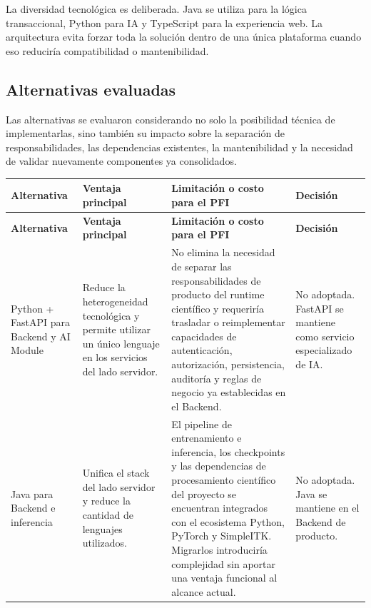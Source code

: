 La diversidad tecnológica es deliberada. Java se utiliza para la lógica transaccional, Python para IA y TypeScript para la experiencia web. La arquitectura evita forzar toda la solución dentro de una única plataforma cuando eso reduciría compatibilidad o mantenibilidad.

\subsection{Alternativas evaluadas}

Las alternativas se evaluaron considerando no solo la posibilidad técnica de implementarlas, sino también su impacto sobre la separación de responsabilidades, las dependencias existentes, la mantenibilidad y la necesidad de validar nuevamente componentes ya consolidados.

{\scriptsize
\setlength{\LTleft}{0pt}
\setlength{\LTright}{0pt}
\setlength{\tabcolsep}{2pt}
\renewcommand{\arraystretch}{1.18}
\label{tab:arch-alternativas}
\begin{longtable}{>{\raggedright\arraybackslash}p{} >{\raggedright\arraybackslash}p{} >{\raggedright\arraybackslash}p{} >{\raggedright\arraybackslash}p{}}
\hline
\textbf{Alternativa} & \textbf{Ventaja principal} & \textbf{Limitación o costo para el PFI} & \textbf{Decisión} \\
\hline
\endfirsthead
\hline
\textbf{Alternativa} & \textbf{Ventaja principal} & \textbf{Limitación o costo para el PFI} & \textbf{Decisión} \\
\hline
\endhead
\hline
\endfoot
Python + FastAPI para Backend y AI Module & Reduce la heterogeneidad tecnológica y permite utilizar un único lenguaje en los servicios del lado servidor. & No elimina la necesidad de separar las responsabilidades de producto del runtime científico y requeriría trasladar o reimplementar capacidades de autenticación, autorización, persistencia, auditoría y reglas de negocio ya establecidas en el Backend. & No adoptada. FastAPI se mantiene como servicio especializado de IA. \\
Java para Backend e inferencia & Unifica el stack del lado servidor y reduce la cantidad de lenguajes utilizados. & El pipeline de entrenamiento e inferencia, los checkpoints y las dependencias de procesamiento científico del proyecto se encuentran integrados con el ecosistema Python, PyTorch y SimpleITK. Migrarlos introduciría complejidad sin aportar una ventaja funcional al alcance actual. & No adoptada. Java se mantiene en el Backend de producto. \\

\end{longtable}}
